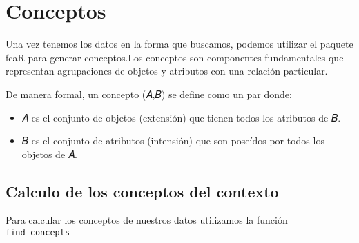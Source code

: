 \documentclass[
  letterpaper,
  DIV=11,
  numbers=noendperiod]{scrreprt}
\newenvironment{Shaded}{\begin{snugshade}}{\end{snugshade}}
\newcommand{\AttributeTok}[1]{\textcolor[rgb]{0.40,0.45,0.13}{#1}}
\newcommand{\ConstantTok}[1]{\textcolor[rgb]{0.56,0.35,0.01}{#1}}
\newcommand{\DecValTok}[1]{\textcolor[rgb]{0.68,0.00,0.00}{#1}}
\newcommand{\FunctionTok}[1]{\textcolor[rgb]{0.28,0.35,0.67}{#1}}
\newcommand{\NormalTok}[1]{\textcolor[rgb]{0.00,0.23,0.31}{#1}}
\newcommand{\SpecialCharTok}[1]{\textcolor[rgb]{0.37,0.37,0.37}{#1}}
\newcommand{\StringTok}[1]{\textcolor[rgb]{0.13,0.47,0.30}{#1}}
\begin{document}
\begin{Shaded}
\end{Shaded}

\section{Conceptos}\label{conceptos}

Una vez tenemos los datos en la forma que buscamos, podemos utilizar el
paquete fcaR para generar conceptos.Los conceptos son componentes
fundamentales que representan agrupaciones de objetos y atributos con
una relación particular.

De manera formal, un concepto (𝐴,𝐵) se define como un par donde:

\begin{itemize}
\item
  𝐴 es el conjunto de objetos (extensión) que tienen todos los atributos
  de 𝐵.
\item
  𝐵 es el conjunto de atributos (intensión) que son poseídos por todos
  los objetos de 𝐴.
\end{itemize}

\subsection{Calculo de los conceptos del
contexto}\label{calculo-de-los-conceptos-del-contexto}

Para calcular los conceptos de nuestros datos utilizamos la función
\texttt{find\_concepts}

\begin{Shaded}
\end{Shaded}
\end{document}
